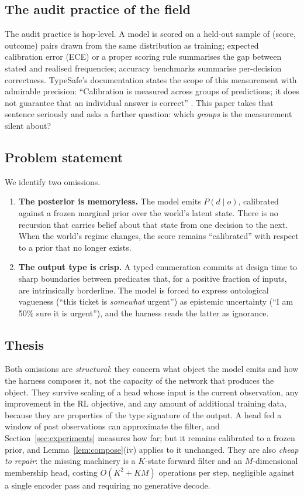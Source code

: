 \documentclass[11pt,a4paper]{article}
\numberwithin{equation}{section}
\theoremstyle{plain}
\theoremstyle{definition}
\theoremstyle{remark}
\begin{document}
\subsection{The audit practice of the field}

The audit practice is hop-level. A model is scored on a held-out sample of (score, outcome) pairs drawn from the same distribution as training; expected calibration error (ECE) or a proper scoring rule summarises the gap between stated and realised frequencies; accuracy benchmarks summarise per-decision correctness. TypeSafe's documentation states the scope of this measurement with admirable precision: ``Calibration is measured across groups of predictions; it does not guarantee that an individual answer is correct'' \citep{typesafe2026docs}. This paper takes that sentence seriously and asks a further question: which \emph{groups} is the measurement silent about?

\subsection{Problem statement}

We identify two omissions.

\begin{enumerate}[label=(\roman*),leftmargin=2em]
\item \textbf{The posterior is memoryless.} The model emits $P(d \mid o)$, calibrated against a frozen marginal prior over the world's latent state. There is no recursion that carries belief about that state from one decision to the next. When the world's regime changes, the score remains ``calibrated'' with respect to a prior that no longer exists.
\item \textbf{The output type is crisp.} A typed enumeration commits at design time to sharp boundaries between predicates that, for a positive fraction of inputs, are intrinsically borderline. The model is forced to express ontological vagueness (``this ticket is \emph{somewhat} urgent'') as epistemic uncertainty (``I am 50\% sure it is urgent''), and the harness reads the latter as ignorance.
\end{enumerate}

\subsection{Thesis}

Both omissions are \emph{structural}: they concern what object the model emits and how the harness composes it, not the capacity of the network that produces the object. They survive scaling of a head whose input is the current observation, any improvement in the RL objective, and any amount of additional training data, because they are properties of the type signature of the output. A head fed a window of past observations can approximate the filter, and Section~\ref{sec:experiments} measures how far; but it remains calibrated to a frozen prior, and Lemma~\ref{lem:compose}(iv) applies to it unchanged. They are also \emph{cheap to repair}: the missing machinery is a $K$-state forward filter and an $M$-dimensional membership head, costing $O(K^2 + KM)$ operations per step, negligible against a single encoder pass and requiring no generative decode.
\end{document}
